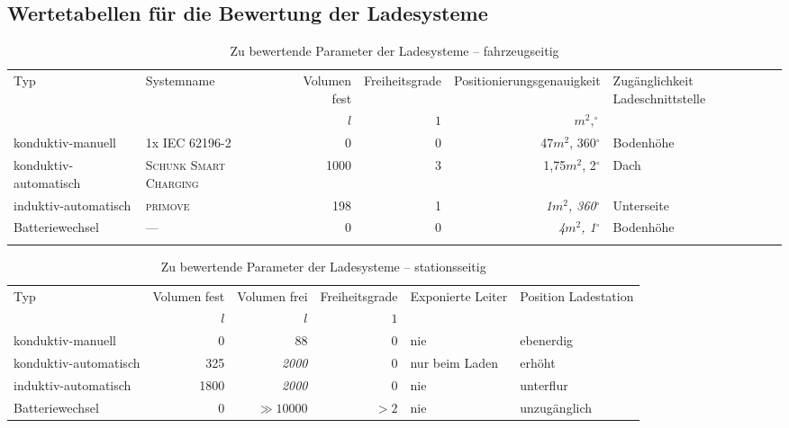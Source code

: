 \subsection{Wertetabellen für die Bewertung der Ladesysteme}
\begin{table}[h] \centering
	\begin{tabulary}{\linewidth}{LLRRRL}
		\toprule
		Typ                   & Systemname                     & Volumen fest & Freiheitsgrade &   Positionierungsgenauigkeit & Zugänglichkeit Ladeschnittstelle \\
		&                                &          $l$ &            $1$ &                 $m^2,^\circ$ &  \\ \midrule
		konduktiv-manuell     & 1x \textsc{IEC 62196-2}        &            0 &              0 &       47$m^2$, 360$^{\circ}$ &                        Bodenhöhe \\
		konduktiv-automatisch & \textsc{Schunk Smart Charging} &         1000 &              3 &       1,75$m^2$, 2$^{\circ}$ &                             Dach \\
		induktiv-automatisch  & \textsc{primove}               &          198 &              1 & \emph{1$m^2$, 360$^{\circ}$} &                       Unterseite \\
		Batteriewechsel       & ---                            &            0 &              0 &   \emph{4$m^2$, 1$^{\circ}$} &                        Bodenhöhe \\ \bottomrule
		&
	\end{tabulary}
	\caption{Zu bewertende Parameter der Ladesysteme – fahrzeugseitig}
	\label{tab_parameterLadesysDirektFzg}
\end{table}

\begin{table}[h] \centering
	\begin{tabulary}{\linewidth}{LRRRLL}
		\toprule
		Typ                   & Volumen fest & Volumen frei & Freiheitsgrade & Exponierte Leiter & Position Ladestation \\
		&          $l$ &          $l$ &            $1$ &                   &  \\ \midrule
		konduktiv-manuell     &            0 &           88 &              0 &               nie &            ebenerdig \\
		konduktiv-automatisch &          325 &  \emph{2000} &              0 &    nur beim Laden &               erhöht \\
		induktiv-automatisch  &         1800 &  \emph{2000} &              0 &               nie &            unterflur \\
		Batteriewechsel       &            0 &  $\gg10000$ &           $>2$ &               nie &         unzugänglich \\ \bottomrule
	\end{tabulary}
	\caption{Zu bewertende Parameter der Ladesysteme – stationsseitig}
	\label{tab_parameterLadesysDirektStat}
\end{table}
\FloatBarrier
\newpage
